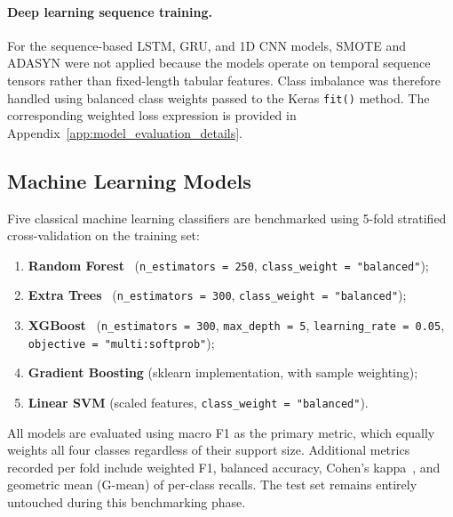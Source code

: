 \paragraph{Deep learning sequence training.}
For the sequence-based LSTM, GRU, and 1D CNN models, SMOTE and ADASYN were
not applied because the models operate on temporal sequence tensors rather
than fixed-length tabular features. Class imbalance was therefore handled
using balanced class weights passed to the Keras \texttt{fit()} method.
The corresponding weighted loss expression is provided in
Appendix~\ref{app:model_evaluation_details}.


\subsection{Machine Learning Models}
\label{subsec:benchmarking}

Five classical machine learning classifiers are benchmarked using
5-fold stratified cross-validation on the training set:

\begin{enumerate}
    \item \textbf{Random Forest}~\cite{breiman2001randomforest}
          (\texttt{n\_estimators = 250},
          \texttt{class\_weight = "balanced"});
    \item \textbf{Extra Trees}~\cite{geurts2006extratrees}
          (\texttt{n\_estimators = 300},
          \texttt{class\_weight = "balanced"});
    \item \textbf{XGBoost}~\cite{chen2016xgboost}
          (\texttt{n\_estimators = 300},
          \texttt{max\_depth = 5},
          \texttt{learning\_rate = 0.05},
          \texttt{objective = "multi:softprob"});
    \item \textbf{Gradient Boosting} (sklearn implementation, with
          sample weighting);
    \item \textbf{Linear SVM} (scaled features,
          \texttt{class\_weight = "balanced"}).
\end{enumerate}

All models are evaluated using macro F1 as the primary metric, which
equally weights all four classes regardless of their support size.
Additional metrics recorded per fold include weighted F1, balanced
accuracy, Cohen's kappa~\cite{cohen1960kappa}, and geometric mean
(G-mean) of per-class recalls. The test set remains entirely
untouched during this benchmarking phase.

